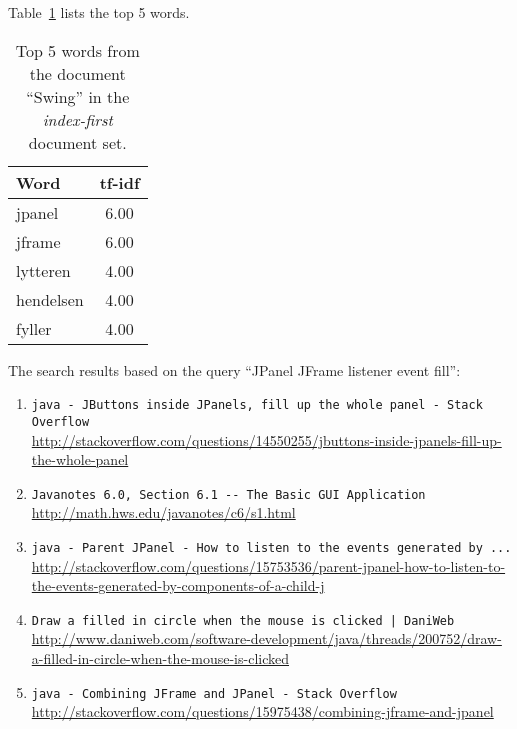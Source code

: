 Table~\ref{tab:topWords-no-swing} lists the top 5 words.
\begin{table}[H]
\centering
\begin{tabular}{|l|c|}
\hline\hline
    Word & tf-idf \\
\hline
    jpanel & 6.00 \\
    jframe & 6.00 \\
    lytteren & 4.00 \\
    hendelsen & 4.00 \\
    fyller & 4.00 \\
\hline\hline
\end{tabular}
\caption{Top 5 words from the document ``Swing'' in the \textit{index-first} document set.}
\label{tab:topWords-no-swing}
\end{table}

The search results based on the query ``JPanel JFrame listener event fill'':

\begin{enumerate}
\item
    \verb|java - JButtons inside JPanels, fill up the whole panel - Stack Overflow| \\
    \url{http://stackoverflow.com/questions/14550255/jbuttons-inside-jpanels-fill-up-the-whole-panel}
\item
    \verb|Javanotes 6.0, Section 6.1 -- The Basic GUI Application| \\
    \url{http://math.hws.edu/javanotes/c6/s1.html}
\item
    \verb|java - Parent JPanel - How to listen to the events generated by ...| \\
    \url{http://stackoverflow.com/questions/15753536/parent-jpanel-how-to-listen-to-the-events-generated-by-components-of-a-child-j}
\item
    \verb#Draw a filled in circle when the mouse is clicked | DaniWeb# \\
    \url{http://www.daniweb.com/software-development/java/threads/200752/draw-a-filled-in-circle-when-the-mouse-is-clicked}
\item
    \verb|java - Combining JFrame and JPanel - Stack Overflow| \\
    \url{http://stackoverflow.com/questions/15975438/combining-jframe-and-jpanel}
\end{enumerate}

